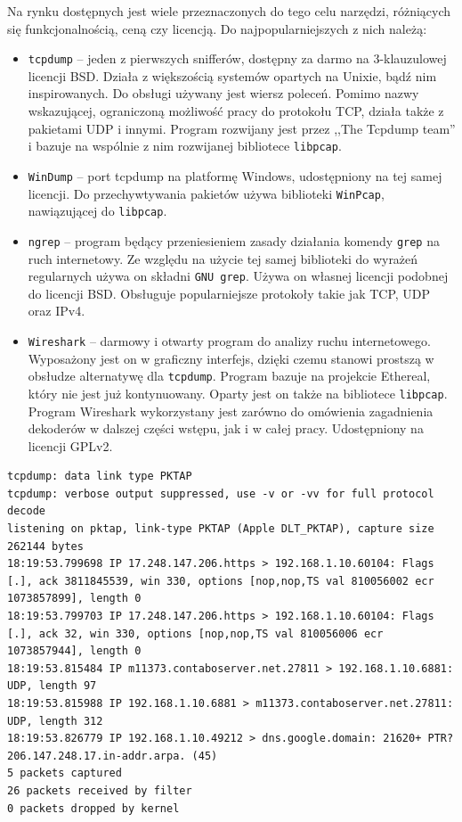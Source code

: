\documentclass[a4paper, 12pt, twoside, openright]{article}
\begin{document}
	Na rynku dostępnych jest wiele przeznaczonych do tego celu narzędzi, różniących się funkcjonalnością, ceną czy licencją.
	Do najpopularniejszych z nich należą:
	\begin{itemize}
		\item \texttt{tcpdump} -- jeden z pierwszych snifferów, dostępny za darmo na 3-klauzulowej licencji BSD. Działa
			z większością systemów opartych na Unixie, bądź nim inspirowanych. Do obsługi używany jest wiersz poleceń.
			Pomimo nazwy wskazującej, ograniczoną możliwość pracy do protokołu TCP, działa także z pakietami UDP i innymi.
			Program rozwijany jest przez ,,The Tcpdump team'' i bazuje na wspólnie z nim rozwijanej bibliotece \texttt{libpcap}.
		\item \texttt{WinDump} -- port tcpdump na platformę Windows, udostępniony na tej samej licencji. Do przechywtywania
			pakietów używa biblioteki \texttt{WinPcap}, nawiązującej do \texttt{libpcap}.
		\item \texttt{ngrep} -- program będący przeniesieniem zasady działania komendy \texttt{grep} na ruch internetowy.
			Ze względu na użycie tej samej biblioteki do wyrażeń regularnych używa on składni \texttt{GNU grep}.
			Używa on własnej licencji podobnej do licencji BSD. Obsługuje popularniejsze protokoły takie jak TCP, UDP oraz IPv4.
		\item \texttt{Wireshark} -- darmowy i otwarty program do analizy ruchu internetowego. Wyposażony jest on w graficzny
			interfejs, dzięki czemu stanowi prostszą w obsłudze alternatywę dla \texttt{tcpdump}. Program bazuje na projekcie
			Ethereal, który nie jest już kontynuowany. Oparty jest on także na bibliotece
			\texttt{libpcap}. Program Wireshark wykorzystany jest zarówno
			do omówienia zagadnienia dekoderów w dalszej części wstępu, jak i w całej pracy. Udostępniony na licencji GPLv2.
	\end{itemize}

\begin{lstlisting}[style=CStyle,caption={Przykładowy output programu \texttt{tcpdump}}]
tcpdump: data link type PKTAP
tcpdump: verbose output suppressed, use -v or -vv for full protocol decode
listening on pktap, link-type PKTAP (Apple DLT_PKTAP), capture size 262144 bytes
18:19:53.799698 IP 17.248.147.206.https > 192.168.1.10.60104: Flags [.], ack 3811845539, win 330, options [nop,nop,TS val 810056002 ecr 1073857899], length 0
18:19:53.799703 IP 17.248.147.206.https > 192.168.1.10.60104: Flags [.], ack 32, win 330, options [nop,nop,TS val 810056006 ecr 1073857944], length 0
18:19:53.815484 IP m11373.contaboserver.net.27811 > 192.168.1.10.6881: UDP, length 97
18:19:53.815988 IP 192.168.1.10.6881 > m11373.contaboserver.net.27811: UDP, length 312
18:19:53.826779 IP 192.168.1.10.49212 > dns.google.domain: 21620+ PTR? 206.147.248.17.in-addr.arpa. (45)
5 packets captured
26 packets received by filter
0 packets dropped by kernel \end{lstlisting}
\end{document}
